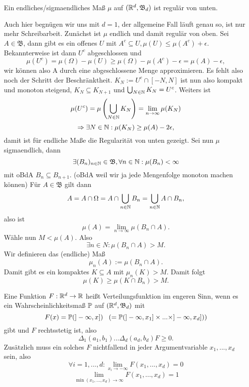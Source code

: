 			\begin{satz}
				Ein endliches/sigmaendliches Maß $\mu$ auf $(\R^d, \mathfrak{B}_d)$ ist regulär von unten.	
			\end{satz}
			
			\begin{bew}
				Auch hier begnügen wir uns mit $d=1$, der allgemeine Fall läuft genau so, ist nur mehr Schreibarbeit.\newline
				Zunächst ist $\mu$ endlich und damit regulär von oben. Sei $A\in\mathfrak{B}$, dann gibt es ein offenes $U$ mit $A^c\subseteq U, \mu(U)\le\mu(A^c)+\epsilon$. Bekannterweise ist dann $U^c$ abgeschlossen und
				\[ \mu(U^c)=\mu(\Omega)-\mu(U)\ge \mu(\Omega)-\mu(A^c)-\epsilon=\mu(A)-\epsilon, \]
				wir können also A durch eine abgeschlossene Menge approximieren. Es fehlt also noch der Schritt der Beschränktheit. $K_N:=U^c\cap[-N,N]$ ist nun also kompakt und monoton steigend, $K_N\subseteq K_{N+1}$ und $\bigcup_{N\in\N}K_N=U^c$. Weiters ist
				\[ \mu(U^c)=\mu\left(\bigcup_{N\in\N} K_N\right)=\lim\limits_{n\to\infty}\mu(K_N) \]
				\[ \Rightarrow \exists N\in\N: \mu(K_N)\ge\mu(A)-2\epsilon, \]
				damit ist für endliche Maße die Regularität von unten gezeigt. \newline
				Sei nun $\mu$ sigmaendlich, dann 
				\[ \exists (B_n)_{n\in\N}\in\mathfrak{B}, \forall n\in\N:\mu(B_n)<\infty \]
				mit oBdA $B_n\subseteq B_{n+1}$. (oBdA weil wir ja jede Mengenfolge monoton machen können)\newline
				Für $A\in\mathfrak{B}$ gilt dann
				\[ A=A\cap\Omega=A\cap\bigcup_{n\in\N} B_n=\bigcup_{n\in\N} A\cap B_n, \]
				also ist 
				\[ \mu(A)=\lim\limits_{n\to\infty}\mu(B_n\cap A). \]
				Wähle nun $M<\mu(A)$. Also 
				\[ \exists n\in N:\mu(B_n\cap A)> M. \]
				Wir definieren das (endliche) Maß
				\[ \mu_n(A):=\mu(B_n\cap A). \]
				Damit gibt es ein kompaktes $K\subseteq A$ mit $\mu_n(K)>M$. Damit folgt
				\[ \mu(K)\ge\mu(K\cap B_n)>M. \]
				\arge
			\end{bew}
			
			\begin{bem}
				Eine Funktion $F:\R^d\to\R$ heißt Verteilungsfunktion im engeren Sinn, wenn es ein Wahrscheinlichkeitsmaß $\P$ auf $(\R^d, \mathfrak{B}_d)$ mit 
				\[ F(x)=\P(]-\infty,x])\:\:\:\left(=\P(]-\infty,x_1]\times...\times]-\infty,x_d])\right) \]
				gibt und $F$ rechtsstetig ist, also
				\[ \Delta_1(a_1,b_1)...\Delta_d(a_d,b_d)F\ge0. \]
				Zusätzlich muss ein solches $F$ nichtfallend in jeder Argumentvariable $x_1,...,x_d$ sein, also
				\[ \forall i=1,...,d:\lim\limits_{x_i\to-\infty}F(x_1,...,x_d)=0 \]  
				\[ \lim\limits_{\min(x_1,...,x_d)\to\infty}F(x_1,...,x_d)=1 \]
			\end{bem}
			
